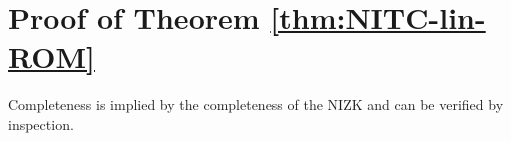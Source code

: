 

\section{Proof of Theorem \ref{thm:NITC-lin-ROM}} %
\label{app:NITC-lin-ROM}

Completeness is implied by the completeness of the NIZK and can be verified by inspection. 



%
%
%
%
%



